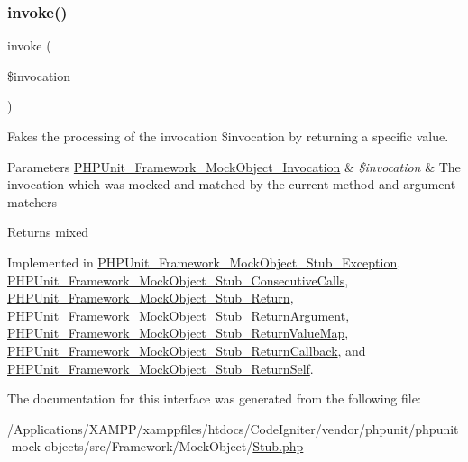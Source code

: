 \subsubsection{\texorpdfstring{invoke()}{invoke()}}
{\footnotesize\ttfamily invoke (\begin{DoxyParamCaption}\item[{\mbox{\hyperlink{interface_p_h_p_unit___framework___mock_object___invocation}{P\+H\+P\+Unit\+\_\+\+Framework\+\_\+\+Mock\+Object\+\_\+\+Invocation}}}]{\$invocation }\end{DoxyParamCaption})}

Fakes the processing of the invocation \$invocation by returning a specific value.


\begin{DoxyParams}[1]{Parameters}
\mbox{\hyperlink{interface_p_h_p_unit___framework___mock_object___invocation}{P\+H\+P\+Unit\+\_\+\+Framework\+\_\+\+Mock\+Object\+\_\+\+Invocation}} & {\em \$invocation} & The invocation which was mocked and matched by the current method and argument matchers\\
\hline
\end{DoxyParams}
\begin{DoxyReturn}{Returns}
mixed 
\end{DoxyReturn}


Implemented in \mbox{\hyperlink{class_p_h_p_unit___framework___mock_object___stub___exception_af2fc26e6704e08d95f2ea1d9c5ffb865}{P\+H\+P\+Unit\+\_\+\+Framework\+\_\+\+Mock\+Object\+\_\+\+Stub\+\_\+\+Exception}}, \mbox{\hyperlink{class_p_h_p_unit___framework___mock_object___stub___consecutive_calls_af2fc26e6704e08d95f2ea1d9c5ffb865}{P\+H\+P\+Unit\+\_\+\+Framework\+\_\+\+Mock\+Object\+\_\+\+Stub\+\_\+\+Consecutive\+Calls}}, \mbox{\hyperlink{class_p_h_p_unit___framework___mock_object___stub___return_af2fc26e6704e08d95f2ea1d9c5ffb865}{P\+H\+P\+Unit\+\_\+\+Framework\+\_\+\+Mock\+Object\+\_\+\+Stub\+\_\+\+Return}}, \mbox{\hyperlink{class_p_h_p_unit___framework___mock_object___stub___return_argument_af2fc26e6704e08d95f2ea1d9c5ffb865}{P\+H\+P\+Unit\+\_\+\+Framework\+\_\+\+Mock\+Object\+\_\+\+Stub\+\_\+\+Return\+Argument}}, \mbox{\hyperlink{class_p_h_p_unit___framework___mock_object___stub___return_value_map_af2fc26e6704e08d95f2ea1d9c5ffb865}{P\+H\+P\+Unit\+\_\+\+Framework\+\_\+\+Mock\+Object\+\_\+\+Stub\+\_\+\+Return\+Value\+Map}}, \mbox{\hyperlink{class_p_h_p_unit___framework___mock_object___stub___return_callback_af2fc26e6704e08d95f2ea1d9c5ffb865}{P\+H\+P\+Unit\+\_\+\+Framework\+\_\+\+Mock\+Object\+\_\+\+Stub\+\_\+\+Return\+Callback}}, and \mbox{\hyperlink{class_p_h_p_unit___framework___mock_object___stub___return_self_af2fc26e6704e08d95f2ea1d9c5ffb865}{P\+H\+P\+Unit\+\_\+\+Framework\+\_\+\+Mock\+Object\+\_\+\+Stub\+\_\+\+Return\+Self}}.



The documentation for this interface was generated from the following file\+:\begin{DoxyCompactItemize}
\item 
/\+Applications/\+X\+A\+M\+P\+P/xamppfiles/htdocs/\+Code\+Igniter/vendor/phpunit/phpunit-\/mock-\/objects/src/\+Framework/\+Mock\+Object/\mbox{\hyperlink{_stub_8php}{Stub.\+php}}\end{DoxyCompactItemize}
